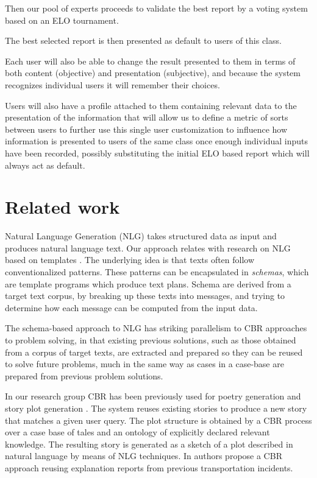 Then our pool of experts proceeds to validate the best report by a voting system based on an ELO tournament. 

The best selected report is then presented as default to users of this class. 

Each user will also be able to change the result presented to them in terms of both content (objective) and presentation (subjective), and because the system recognizes individual users it will remember their choices.

Users will also have a profile attached to them containing relevant data to the presentation of the information that will allow us to define a metric of sorts between users to further use this single user customization to influence how information is presented to users of the same class once enough individual inputs have been recorded, possibly substituting the initial ELO based report which will always act as default.

\section{Related work}

Natural Language Generation (NLG) takes structured data as input and produces natural language text. Our approach relates with research on NLG  based on templates \cite{McKeown}. The underlying idea is that texts often follow conventionalized patterns. These patterns can be encapsulated in {\it schemas}, which are template programs which produce text plans. Schema are derived from a target text corpus, by breaking up these texts into messages, and trying to determine how each message can be
computed from the input data. 

The schema-based approach to NLG has striking parallelism to CBR approaches to problem solving, in that existing previous solutions, such as those obtained from a corpus of target texts, are extracted and prepared so they can be reused to solve future problems, much in the same way as cases in a case-base are prepared from previous problem solutions.

In our research group CBR has been previously used for poetry generation \cite{diaz2002} and story plot generation \cite{GervasDPH05}. The system reuses existing stories to produce a new story that matches a given user query. The plot structure is obtained by a CBR process over a case base of tales and an ontology of explicitly declared relevant knowledge. The resulting story is generated as a sketch of a plot described in natural language by means of NLG techniques. In \cite{sizov2017} authors propose a CBR approach reusing explanation reports from previous transportation incidents.  

